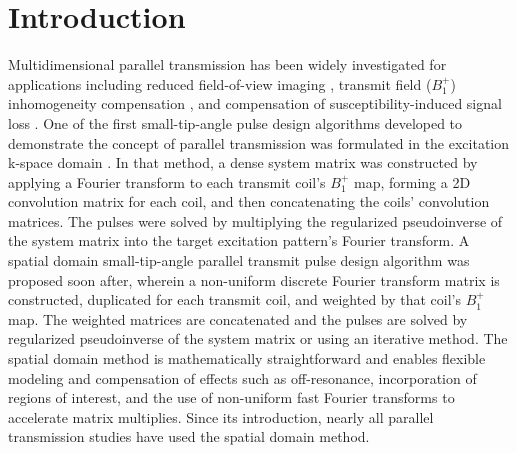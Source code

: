 \section* {Introduction}

\par Multidimensional parallel transmission \cite{Katscher:2003:Magn-Reson-Med:12509830,zhu2004parallel} has been widely investigated for applications including
reduced field-of-view imaging \cite{malik:mrm:2015,mooiweer:2016},
transmit field ($B_1^+$) inhomogeneity compensation \cite{Zhang:2007:Magn-Reson-Med:16526012,cloos:kpstd:2012},
and compensation of susceptibility-induced signal loss \cite{deng:2009}.
One of the first small-tip-angle pulse design algorithms developed to demonstrate the concept of parallel transmission was formulated in the 
excitation k-space domain \cite{Katscher:2003:Magn-Reson-Med:12509830}.
In that method, a dense system matrix was constructed by applying a Fourier transform to each transmit coil's $B_1^+$ map,
forming a 2D convolution matrix for each coil, and then concatenating the coils' convolution matrices.
The pulses were solved by multiplying the 
regularized pseudoinverse of the system matrix into the target excitation pattern's Fourier transform. 
A spatial domain small-tip-angle parallel transmit pulse design algorithm 
\cite{Grissom:2006:MRM} was proposed soon after,
wherein a non-uniform discrete Fourier transform matrix is constructed, 
duplicated for each transmit coil, and weighted by that coil's $B_1^+$ map.
The weighted matrices are concatenated and the pulses are solved by regularized pseudoinverse of the system matrix
or using an iterative method.
The spatial domain method is mathematically straightforward 
and enables flexible modeling and compensation of effects such as off-resonance, 
incorporation of regions of interest,
and the use of non-uniform fast Fourier transforms to accelerate matrix multiplies.
Since its introduction, nearly all parallel transmission studies have used the spatial domain method. 

